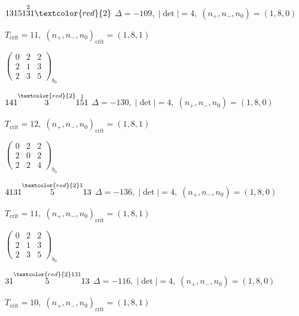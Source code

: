 \documentclass[10pt]{article}
\begin{document}
\smallskip

$13151\overset{2}{3}1\textcolor{red}{2}$ \quad $\Delta=-109,\; |\det|=4,\; (n_+,n_-,n_0)=(1,8,0)$

\hspace{1em}$T_{\text{crit}}=11,\; (n_+,n_-,n_0)_{\text{crit}}=(1,8,1)$

\hspace{2em}$\left(\begin{smallmatrix}0 & 2 & 2 \\ 2 & 1 & 3 \\ 2 & 3 & 5\end{smallmatrix}\right)_{\!b_0}$

\smallskip

$141\overset{\textcolor{red}{2}}{3}1\overset{1}{5}1$ \quad $\Delta=-130,\; |\det|=4,\; (n_+,n_-,n_0)=(1,8,0)$

\hspace{1em}$T_{\text{crit}}=12,\; (n_+,n_-,n_0)_{\text{crit}}=(1,8,1)$

\hspace{2em}$\left(\begin{smallmatrix}0 & 2 & 2 \\ 2 & 0 & 2 \\ 2 & 2 & 4\end{smallmatrix}\right)_{\!b_0}$

\smallskip

$4131\overset{\textcolor{red}{2}1}{5}13$ \quad $\Delta=-136,\; |\det|=4,\; (n_+,n_-,n_0)=(1,8,0)$

\hspace{1em}$T_{\text{crit}}=11,\; (n_+,n_-,n_0)_{\text{crit}}=(1,8,1)$

\hspace{2em}$\left(\begin{smallmatrix}0 & 2 & 2 \\ 2 & 1 & 3 \\ 2 & 3 & 5\end{smallmatrix}\right)_{\!b_0}$

\smallskip

$31\overset{\textcolor{red}{2}131}{5}13$ \quad $\Delta=-116,\; |\det|=4,\; (n_+,n_-,n_0)=(1,8,0)$

\hspace{1em}$T_{\text{crit}}=10,\; (n_+,n_-,n_0)_{\text{crit}}=(1,8,1)$
\end{document}
